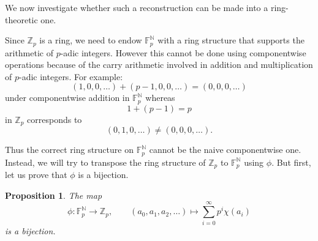 \documentclass[oneside, a4paper, onecolumn, 11pt]{article}
\newtheorem{proposition}{Proposition}
\theoremstyle{definition}
\begin{document}
We now investigate whether such a reconstruction can be made into a ring-theoretic one.

Since $\mathbb{Z}_p$ is a ring, we need to endow $\mathbb{F}_p^{\mathbb{N}}$ with a ring structure that supports the arithmetic of $p$-adic integers. However this cannot be done using componentwise operations because of the carry arithmetic involved in addition and multiplication of $p$-adic integers. For example:
\[(1,0,0,\ldots)+(p-1,0,0,\ldots)=(0,0,0,\ldots)\] under componentwise addition in $\mathbb{F}_p^{\mathbb{N}}$ whereas \[1+(p-1)=p\] in $\mathbb{Z}_p$ corresponds to \[(0,1,0,\ldots)\ne (0,0,0,\ldots).\]

Thus the correct ring structure on $\mathbb{F}_p^{\mathbb{N}}$ cannot be the naive componentwise one. Instead, we will try to transpose the ring structure of $\mathbb{Z}_p$ to $\mathbb{F}_p^{\mathbb{N}}$ using $\phi$. But first, let us prove that $\phi$ is a bijection.

\begin{proposition}
The map
\[\phi:\mathbb F_p^{\mathbb N}\to \mathbb Z_p,\qquad (a_0,a_1,a_2,\ldots)\mapsto \sum_{i=0}^\infty p^i\chi(a_i)\]
is a bijection.
\end{proposition}
\end{document}
